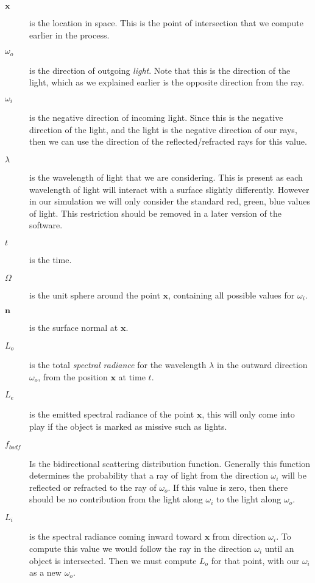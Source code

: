 \documentclass[../pbr.tex]{subfile}
\begin{document}
\begin{description}
  \item[$\mathbf{x}$] is the location in space. This is the point of
    intersection that we compute earlier in the process.
  \item[$\omega_o$] is the direction of outgoing \textit{light}. Note that this
    is the direction of the light, which as we explained earlier is the opposite
    direction from the ray.
  \item[$\omega_i$] is the negative direction of incoming light. Since this is
    the negative direction of the light, and the light is the negative
    direction of our rays, then we can use the direction of the
    reflected/refracted rays for this value.
  \item[$\lambda$] is the wavelength of light that we are considering. This is
    present as each wavelength of light will interact with a surface slightly
    differently. However in our simulation we will only consider the standard
    red, green, blue values of light. This restriction should be removed in a
    later version of the software.
  \item[$t$] is the time.
  \item[$\Omega$] is the unit sphere around the point $\mathbf{x}$, containing
    all possible values for $\omega_i$.
  \item[$\mathbf{n}$] is the surface normal at $\mathbf{x}$.
  \item[$L_o$] is the total \textit{spectral radiance} for the wavelength
    $\lambda$ in the outward direction $\omega_o$, from the position
    $\mathbf{x}$ at time $t$.
  \item[$L_e$] is the emitted spectral radiance of the point $\mathbf{x}$, this
    will only come into play if the object is marked as missive such as
    lights.
  \item[$f_{bsdf}$] Is the bidirectional scattering distribution function.
    Generally this function determines the probability that a ray of light from
    the direction $\omega_i$ will be reflected or refracted to the ray of
    $\omega_o$. If this value is zero, then there should be no contribution
    from the light along $\omega_i$ to the light along $\omega_o$.
  \item[$L_i$] is the spectral radiance coming inward toward $\mathbf{x}$ from
    direction $\omega_i$. To compute this value we would follow the ray in the
    direction $\omega_i$ until an object is intersected. Then we must compute
    $L_o$ for that point, with our $\omega_i$ as a new $\omega_o$.
\end{description}
\end{document}
